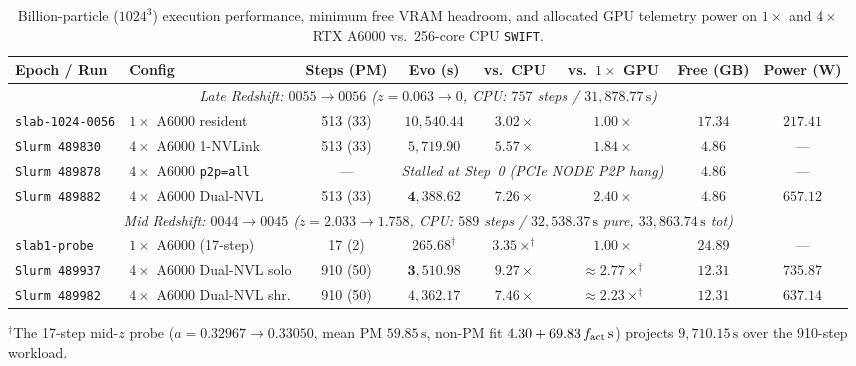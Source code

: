 \documentclass[aps,prd,reprint,superscriptaddress,nofootinbib,amsmath,amssymb,floatfix,longbibliography]{revtex4-2}
\begin{document}
\begin{table}[!tbp]
\caption{Billion-particle ($1024^3$) execution performance, minimum free VRAM headroom, and allocated GPU telemetry power on $1\times$ and $4\times$ RTX A6000 vs.\ 256-core CPU \texttt{SWIFT}.}\label{tab:perf1024}
\footnotesize
\setlength{\tabcolsep}{3pt}
\begin{ruledtabular}
\begin{tabular}{llcccccc}
Epoch / Run & Config & Steps (PM) & Evo (s) & vs.\ CPU & vs.\ $1\times$ GPU & Free (GB) & Power (W) \\
\hline
\multicolumn{8}{c}{\textit{Late Redshift: $0055 \rightarrow 0056$ ($z = 0.063 \rightarrow 0$, CPU: $757$ steps / $31{,}878.77\,\mathrm{s}$)}} \\
\texttt{slab-1024-0056} & $1\times$ A6000 resident & 513 (33) & $10{,}540.44$ & $3.02\times$ & $1.00\times$ & $17.34$ & $217.41$ \\
\texttt{Slurm 489830} & $4\times$ A6000 1-NVLink & 513 (33) & $5{,}719.90$ & $5.57\times$ & $1.84\times$ & $4.86$ & --- \\
\texttt{Slurm 489878} & $4\times$ A6000 \texttt{p2p=all} & --- & \multicolumn{3}{c}{\textit{Stalled at Step~0 (PCIe NODE P2P hang)}} & $4.86$ & --- \\
\texttt{Slurm 489882} & $4\times$ A6000 Dual-NVL & 513 (33) & $\mathbf{4{,}388.62}$ & $\mathbf{7.26\times}$ & $\mathbf{2.40\times}$ & $4.86$ & $657.12$ \\
\hline
\multicolumn{8}{c}{\textit{Mid Redshift: $0044 \rightarrow 0045$ ($z = 2.033 \rightarrow 1.758$, CPU: $589$ steps / $32{,}538.37\,\mathrm{s}$ pure, $33{,}863.74\,\mathrm{s}$ tot)}} \\
\texttt{slab1-probe} & $1\times$ A6000 (17-step) & 17 (2) & $265.68^\dagger$ & $3.35\times^\dagger$ & $1.00\times$ & $24.89$ & --- \\
\texttt{Slurm 489937} & $4\times$ A6000 Dual-NVL solo & 910 (50) & $\mathbf{3{,}510.98}$ & $\mathbf{9.27\times}$ & $\approx 2.77\times^\dagger$ & $\mathbf{12.31}$ & $735.87$ \\
\texttt{Slurm 489982} & $4\times$ A6000 Dual-NVL shr. & 910 (50) & $4{,}362.17$ & $7.46\times$ & $\approx 2.23\times^\dagger$ & $12.31$ & $637.14$ \\
\end{tabular}
\end{ruledtabular}
\begin{flushleft}
\footnotesize $^\dagger$The 17-step mid-$z$ probe ($a = 0.32967 \rightarrow 0.33050$, mean PM $59.85\,\mathrm{s}$, non-PM fit $4.30 + 69.83\,f_{\rm act}\,\mathrm{s}$) projects $9{,}710.15\,\mathrm{s}$ over the 910-step workload.
\end{flushleft}
\end{table}
\end{document}
